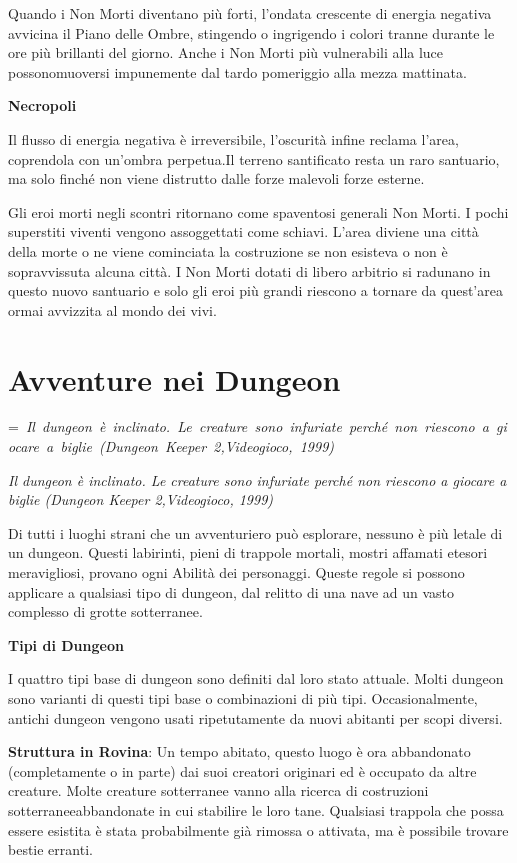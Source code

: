 \documentclass[a4paper,11pt,twoside,openany]{book}
\makeatletter
\newcommand{\mybox}[1]{%
	\setbox0=\hbox{#1}%
	\setlength{\@tempdima}{\dimexpr\wd0+13pt}%
	\begin{tcolorbox}[boxrule=0.5pt,arc=4pt, breakable,enhanced,
		left=6pt,right=6pt,top=6pt,bottom=6pt,boxsep=0pt,width=\@tempdima]
		#1
	\end{tcolorbox}
}
\makeatother
\begin{document}
{Quando i Non Morti diventano più forti, l'ondata crescente di energia negativa avvicina il Piano delle Ombre, stingendo o ingrigendo i colori tranne durante le ore più brillanti del giorno. Anche i Non Morti più vulnerabili alla luce possonomuoversi impunemente dal tardo pomeriggio alla mezza mattinata.

\textbf{Necropoli}

Il flusso di energia negativa è irreversibile, l'oscurità infine reclama l'area, coprendola con un'ombra perpetua.Il terreno santificato resta un raro santuario, ma solo finché non viene distrutto dalle forze malevoli forze esterne.

Gli eroi morti negli scontri ritornano come spaventosi generali Non Morti. I pochi superstiti viventi vengono assoggettati come schiavi. L'area diviene una città della morte o ne viene cominciata la costruzione se non esisteva o non è sopravvissuta alcuna città. I Non Morti dotati di libero arbitrio si radunano in questo nuovo santuario e solo gli eroi più grandi riescono a tornare da quest'area ormai avvizzita al mondo dei vivi.

\pagebreak

\section{Avventure nei Dungeon}

\label{avventure-nei-dungeon}
\mybox{\textit{
Il dungeon è inclinato. Le creature sono infuriate perché non riescono a giocare a biglie (Dungeon Keeper 2,Videogioco, 1999)
}}\medskip

Di tutti i luoghi strani che un avventuriero può esplorare, nessuno è più letale di un dungeon. Questi labirinti, pieni di trappole mortali, mostri affamati etesori meravigliosi, provano ogni Abilità dei personaggi. Queste regole si possono applicare a qualsiasi tipo di dungeon, dal relitto di una nave ad un vasto complesso di grotte sotterranee.

\textbf{Tipi di Dungeon}

I quattro tipi base di dungeon sono definiti dal loro stato attuale. Molti dungeon sono varianti di questi tipi base o combinazioni di più tipi. Occasionalmente, antichi dungeon vengono usati ripetutamente da nuovi abitanti per scopi diversi.

\textbf{Struttura in Rovina}: Un tempo abitato, questo luogo è ora abbandonato (completamente o in parte) dai suoi creatori originari ed è occupato da altre creature. Molte creature sotterranee vanno alla ricerca di costruzioni sotterraneeabbandonate in cui stabilire le loro tane. Qualsiasi trappola che possa essere esistita è stata probabilmente già rimossa o attivata, ma è possibile trovare bestie erranti.

}
\end{document}
